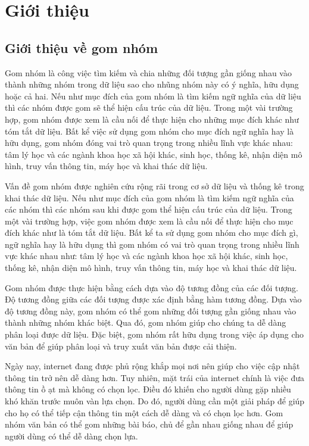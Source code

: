 \chapter{Giới thiệu}
\label{Chapter1}

\section{Giới thiệu về gom nhóm}

Gom nhóm là công việc tìm kiếm và chia những đối tượng gần giống nhau vào thành những nhóm trong dữ liệu sao cho nhũng nhóm này có ý nghĩa, hữu dụng hoặc cả hai. %
Nếu như mục đích của gom nhóm là tìm kiếm ngữ nghĩa của dữ liệu thì các nhóm được gom sẽ thể hiện cấu trúc của dữ liệu.
Trong một vài trường hợp, gom nhóm được xem là cầu nối để thực hiện cho những mục đích khác như tóm tắt dữ liệu.
Bất kể việc sử dụng gom nhóm cho mục đích ngữ nghĩa hay là hữu dụng, gom nhóm đóng vai trò quan trọng trong nhiều lĩnh vực khác nhau: tâm lý học và các ngành khoa học xã hội khác, sinh học, thống kê, nhận diện mô hình, truy vấn thông tin, máy học và khai thác dữ liệu.

Vấn đề gom nhóm được nghiên cứu rộng rãi trong cơ sở dữ liệu và thống kê trong khai thác dữ liệu.
Nếu như mục đích của gom nhóm là tìm kiếm ngữ nghĩa của các nhóm thì  các nhóm sau khi được gom thể hiện cấu trúc của dữ liệu.
Trong một vài trường hợp, việc gom nhóm được xem là cầu nối để thực hiện cho mục đích khác như là tóm tắt dữ liệu.
Bất kể ta sử dụng gom nhóm cho mục đích gì, ngữ nghĩa hay là hữu dụng thì gom nhóm có vai trò quan trọng trong nhiều lĩnh vực khác nhau như: tâm lý học và các ngành khoa học xã hội khác, sinh học, thống kê, nhận diện mô hình, truy vấn thông tin, máy học và khai thác dữ liệu.

Gom nhóm được thực hiện bằng cách dựa vào độ tương đồng của các đối tượng.
Độ tương đồng giữa các đối tượng được xác định bằng hàm tương đồng.
Dựa vào độ tương đồng này, gom nhóm có thể gom những đối tượng gần giống nhau vào thành những nhóm khác biệt.
Qua đó, gom nhóm giúp cho chúng ta dễ dàng phân loại được dữ liệu.
Đặc biệt, gom nhóm rất hữu dụng trong việc áp dụng cho văn bản để giúp phân loại và truy xuất văn bản được cải thiện.

Ngày nay, internet đang được phủ rộng khắp mọi nơi nên giúp cho việc cập nhật thông tin trở nên dễ dàng hơn.
Tuy nhiên, mặt trái của internet chính là việc đưa thông tin ồ ạt mà không có chọn lọc.
Điều đó khiến cho người dùng gặp nhiều khó khăn trước muôn vàn lựa chọn.
Do đó, người dùng cần một giải pháp để giúp cho họ có thể tiếp cận thông tin một cách dễ dàng và có chọn lọc hơn.
Gom nhóm văn bản có thể gom những bài báo, chủ để gần nhau giống nhau để giúp người dùng có thể dễ dàng chọn lựa.

